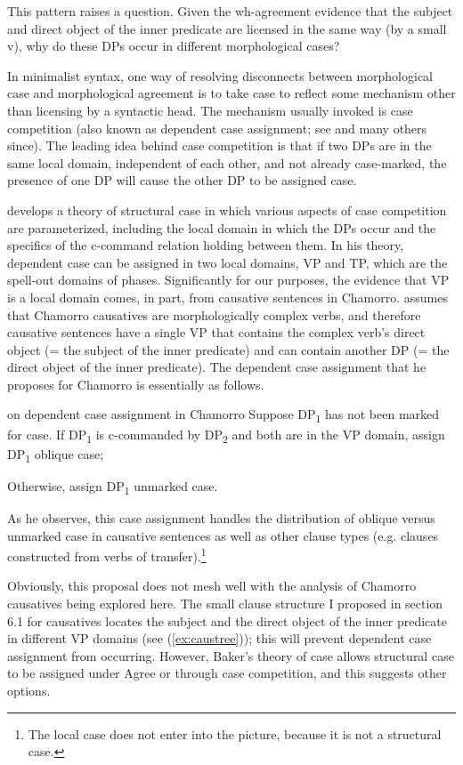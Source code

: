 \documentclass[output=paper,
modfonts
]{LSP/langsci}
\begin{document}
\begin{exe}
\begin{xlist}
This pattern raises a question. Given the wh-agreement evidence that the
subject and direct object of the inner predicate are licensed in the
same way (by a small v), why do these DPs occur in different
morphological cases?

In minimalist syntax, one way of resolving disconnects between
morphological case and morphological agreement is to take case to
reflect some mechanism other than licensing by a syntactic head. The
mechanism usually invoked is case competition (also known as dependent
case assignment; see \citealt{marantz1991} and many others since). The leading
idea behind case competition is that if two DPs are in the same local
domain, independent of each other, and not already case-marked, the
presence of one DP will cause the other DP to be assigned case.

\citet{baker2015} develops a theory of structural case in which various
aspects of case competition are parameterized, including the local
domain in which the DPs occur and the specifics of the c-command
relation holding between them. In his theory, dependent case can be
assigned in two local domains, VP and TP, which are the spell-out
domains of phases. Significantly for our purposes, the evidence that VP
is a local domain comes, in part, from causative sentences in Chamorro.
\citet[137--139]{baker2015} assumes that Chamorro causatives are
morphologically complex verbs, and therefore causative sentences have a
single VP that contains the complex verb's direct object (= the subject
of the inner predicate) and can contain another DP (= the direct object
of the inner predicate). The dependent case assignment that he proposes
for Chamorro is essentially as follows.

\ea \citet{baker2015} on dependent case assignment in Chamorro
\ea 
Suppose DP\textsubscript{1} has not been marked for case. If
DP\textsubscript{1} is c-commanded by DP\textsubscript{2} and both are
in the VP domain, assign DP\textsubscript{1} oblique case;

\ex Otherwise, assign DP\textsubscript{1} unmarked case.
\z
\z

As he observes, this case assignment handles the distribution of oblique
versus unmarked case in causative sentences as well as other clause
types (e.g. clauses constructed from verbs of transfer).\footnote{The
  local case does not enter into the picture, because it is not a
  structural case.}

Obviously, this proposal does not mesh well with the analysis of
Chamorro causatives being explored here. The small clause structure I
proposed in section 6.1 for causatives locates the subject and the
direct object of the inner predicate in different VP domains (see (\ref{ex:caustree}));
this will prevent dependent case assignment from occurring. However,
Baker's theory of case allows structural case to be assigned under Agree
or through case competition, and this suggests other options.


\end{xlist}
\end{exe}
\end{document}
